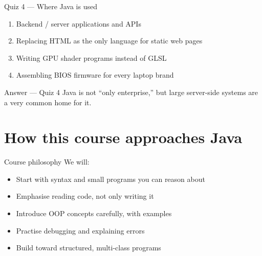 \documentclass[aspectratio=169,11pt]{beamer}
\begin{document}
    \begin{frame}{Quiz 4 --- Where Java is used}
        \begin{enumerate}
            \item Backend / server applications and APIs
            \item Replacing HTML as the only language for static web pages
            \item Writing GPU shader programs instead of GLSL
            \item Assembling BIOS firmware for every laptop brand
        \end{enumerate}
        \quizpause
    \end{frame}

    \begin{frame}{Answer --- Quiz 4}
        \vspace{0.4em}
        Java is not ``only enterprise,'' but large server-side systems are a very common home for it.
    \end{frame}

    \section{How this course approaches Java}

    \begin{frame}{Course philosophy}
        We will:
        \begin{itemize}
            \item Start with syntax and small programs you can reason about
            \item Emphasise reading code, not only writing it
            \item Introduce OOP concepts carefully, with examples
            \item Practise debugging and explaining errors
            \item Build toward structured, multi-class programs
        \end{itemize}
    \end{frame}
\end{document}
